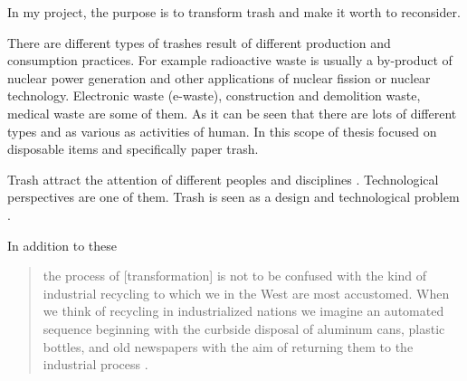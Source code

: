

In my project, the purpose is to transform trash and make it worth to reconsider. 





%
%
There are different types of trashes result of different production and consumption practices. For example radioactive waste is usually a by-product of nuclear power generation and other applications of nuclear fission or nuclear technology. Electronic waste (e-waste), construction and demolition waste, medical waste are some of them. As it can be seen that there are lots of different types and as various as activities of human. In this scope of thesis focused on disposable items and specifically paper trash.





%
%
Trash attract the attention of different peoples and disciplines  \citep{emgin2012trashion}. Technological perspectives are one of them. Trash is seen as a design and technological problem \citep{mcdonough2010cradle}.  


In addition to these
\begin{quote} 
the process of [transformation] is not to be confused with the kind of industrial recycling to which we in the West are most accustomed. When we think of recycling in industrialized nations we imagine an automated sequence beginning with the curbside disposal of aluminum cans, plastic bottles, and old newspapers with the aim of returning them to the industrial process \citep{cerny1996recycled}. 
\end{quote}

